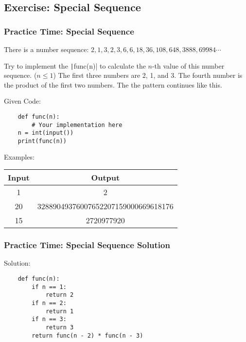 \documentclass{beamer}
\newcommand{\python}[1]{\texttt|#1|}
\begin{document}
\subsection{Exercise: Special Sequence}
\begin{frame}[fragile]
    \frametitle{Practice Time: Special Sequence}

    There is a number sequence:
    $2, 1, 3, 2, 3, 6, 6, 18, 36, 108, 648, 3888, 69984 \cdots$

    Try to implement the \python{func(n)} to calculate
    the $n$-th value of this number sequence. ($n \le 1$)
    The first three numbers are 2, 1, and 3.
    The fourth number is the product of the first two numbers.
    The the pattern continues like this.

    Given Code:
    \begin{verbatim}
    def func(n):
        # Your implementation here
    n = int(input())
    print(func(n))
    \end{verbatim}

    Examples:

    \begin{center}
        \small
        \begin{tabular}{|c|c|}
            \hline
            Input & Output                              \\ \hline
            1     & 2                                   \\ \hline
            20    & 32889049376007652207159000669618176 \\ \hline
            15    & 2720977920                          \\ \hline
        \end{tabular}
    \end{center}
\end{frame}

\begin{frame}[fragile]
    \frametitle{Practice Time: Special Sequence Solution}

    Solution:
    \begin{verbatim}
    def func(n):
        if n == 1:
            return 2
        if n == 2:
            return 1
        if n == 3:
            return 3
        return func(n - 2) * func(n - 3)
    \end{verbatim}
\end{frame}
\end{document}
